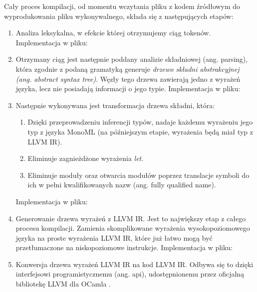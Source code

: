 \documentclass[declaration,shortabstract]{iithesis}
\begin{document}
Cały proces kompilacji, od momentu wczytania pliku z kodem źródłowym do 
wyprodukowania pliku wykonywalnego, składa się z następujących etapów:
\begin{enumerate}
  \item Analiza leksykalna, w efekcie której otrzymujemy ciąg tokenów. 
  Implementacja w pliku: 

  \item Otrzymany ciąg jest następnie poddany analizie składniowej 
  (ang. parsing), która zgodnie z podaną gramatyką generuje \textit{drzewo 
  składni abstrakcyjnej (ang. abstract syntax tree)}. Węzły tego drzewa 
  zawierają jedno z wyrażeń języka, 
  lecz nie posiadają informacji o jego typie. 
  Implementacja w pliku: \newline
 
  \item Następnie wykonywana jest transformacja drzewa składni, która:

  \begin{enumerate}
    \item Dzięki przeprowadzeniu inferencji typów, nadaje każdemu wyrażeniu jego typ z języka MonoML (na późniejszym etapie, wyrażenia będą miał typ 
    z LLVM IR). 
    \item Eliminuje zagnieżdżone wyrażenia \textit{let}.
    \item Eliminuje moduły oraz otwarcia modułów poprzez translacje symboli do 
    ich w pełni kwalifikowanych nazw (ang. fully qualified name).
  \end{enumerate}
  Implementacja w pliku: 

  \item Generowanie drzewa wyrażeń z LLVM IR. Jest to największy etap z całego 
  procesu kompilacji. Zamienia skomplikowane wyrażenia wysokopoziomowego języka
  na proste wyrażenia LLVM IR, które już łatwo mogą być przetłumaczone na 
  niskopoziomowe instrukcje.
  Implementacja w pliku: 

  \item Konwersja drzewa wyrażeń LLVM IR na kod LLVM IR. Odbywa się to dzięki 
  interfejsowi programistycznemu (ang. api), udostępnionemu przez oficjalną 
  bibliotekę LLVM dla OCamla \cite{llvm_in_ocaml}.

\end{enumerate}
\end{document}
